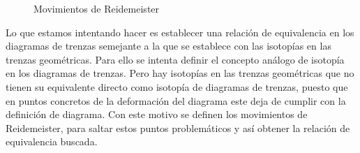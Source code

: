 \documentclass[12pt]{book}
\theoremstyle{definition}
\begin{document}
\begin{figure}[h!]
\centering
\begin{subfigure}[b]{0.6\linewidth}
\begin{center}

\caption{}
\end{center}
\end{subfigure} 


\begin{subfigure}[b]{0.6\linewidth}
\begin{center}

\caption{}
\end{center}
\end{subfigure} 


\caption{Movimientos de Reidemeister}
\label{MR}
\end{figure}

Lo que estamos intentando hacer es establecer una relación de equivalencia en los diagramas de trenzas semejante a la que se establece con las isotopías en las trenzas geométricas. Para ello se intenta definir el concepto análogo de isotopía en los diagramas de trenzas.  Pero hay isotopías en las trenzas geométricas que no tienen su equivalente directo como isotopía de diagramas de trenzas, puesto que en puntos concretos de la deformación del diagrama este deja de cumplir con la definición de diagrama. Con este motivo se definen los movimientos de Reidemeister, para saltar estos puntos problemáticos y así obtener la relación de equivalencia buscada.
\end{document}
